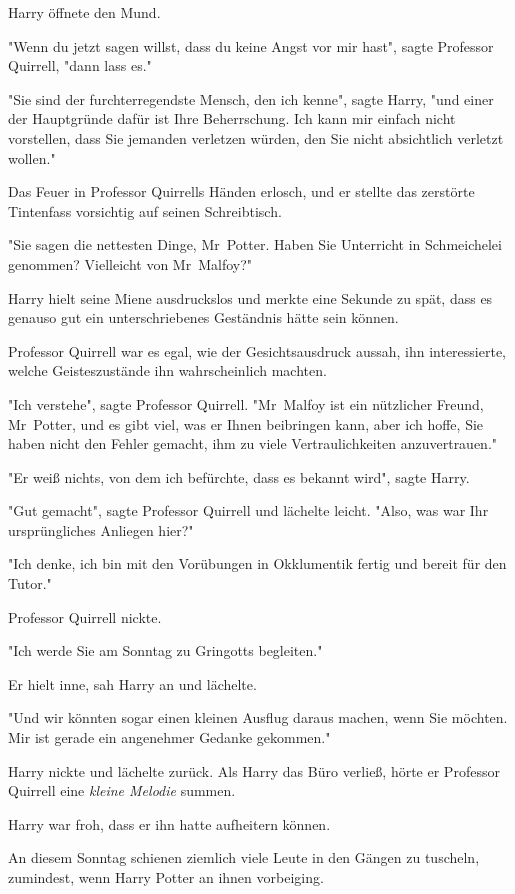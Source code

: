 {Harry öffnete den Mund.

"Wenn du jetzt sagen willst, dass du keine Angst vor mir hast", sagte Professor Quirrell, "dann lass es."

"Sie sind der furchterregendste Mensch, den ich kenne", sagte Harry, "und einer der Hauptgründe dafür ist Ihre Beherrschung. Ich kann mir einfach nicht vorstellen, dass Sie jemanden verletzen würden, den Sie nicht absichtlich verletzt wollen."

Das Feuer in Professor Quirrells Händen erlosch, und er stellte das zerstörte Tintenfass vorsichtig auf seinen Schreibtisch.

"Sie sagen die nettesten Dinge, Mr~Potter. Haben Sie Unterricht in Schmeichelei genommen? Vielleicht von Mr~Malfoy?"

Harry hielt seine Miene ausdruckslos und merkte eine Sekunde zu spät, dass es genauso gut ein unterschriebenes Geständnis hätte sein können.

Professor Quirrell war es egal, wie der Gesichtsausdruck aussah, ihn interessierte, welche Geisteszustände ihn wahrscheinlich machten.

"Ich verstehe", sagte Professor Quirrell. "Mr~Malfoy ist ein nützlicher Freund, Mr~Potter, und es gibt viel, was er Ihnen beibringen kann, aber ich hoffe, Sie haben nicht den Fehler gemacht, ihm zu viele Vertraulichkeiten anzuvertrauen."

"Er weiß nichts, von dem ich befürchte, dass es bekannt wird", sagte Harry.

"Gut gemacht", sagte Professor Quirrell und lächelte leicht. "Also, was war Ihr ursprüngliches Anliegen hier?"

"Ich denke, ich bin mit den Vorübungen in Okklumentik fertig und bereit für den Tutor."

Professor Quirrell nickte.

"Ich werde Sie am Sonntag zu Gringotts begleiten."

Er hielt inne, sah Harry an und lächelte.

"Und wir könnten sogar einen kleinen Ausflug daraus machen, wenn Sie möchten. Mir ist gerade ein angenehmer Gedanke gekommen."

Harry nickte und lächelte zurück. Als Harry das Büro verließ, hörte er Professor Quirrell eine \emph{kleine Melodie} summen.

Harry war froh, dass er ihn hatte aufheitern können.

An diesem Sonntag schienen ziemlich viele Leute in den Gängen zu tuscheln, zumindest, wenn Harry Potter an ihnen vorbeiging.

}
